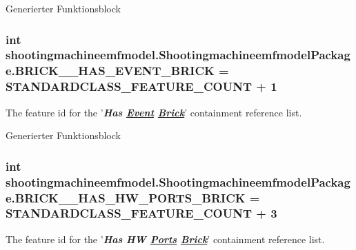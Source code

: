 Generierter Funktionsblock  \hypertarget{interfaceshootingmachineemfmodel_1_1_shootingmachineemfmodel_package_a3ca25fb82ba83cfac1da41d268bd1847}{
\subsubsection[{B\-R\-I\-C\-K\-\_\-\-\_\-\-H\-A\-S\-\_\-\-E\-V\-E\-N\-T\-\_\-\-B\-R\-I\-C\-K}]{\setlength{\rightskip}{0pt plus 5cm}int shootingmachineemfmodel.\-Shootingmachineemfmodel\-Package.\-B\-R\-I\-C\-K\-\_\-\-\_\-\-H\-A\-S\-\_\-\-E\-V\-E\-N\-T\-\_\-\-B\-R\-I\-C\-K = {\bf S\-T\-A\-N\-D\-A\-R\-D\-C\-L\-A\-S\-S\-\_\-\-F\-E\-A\-T\-U\-R\-E\-\_\-\-C\-O\-U\-N\-T} + 1}}\label{interfaceshootingmachineemfmodel_1_1_shootingmachineemfmodel_package_a3ca25fb82ba83cfac1da41d268bd1847}
The feature id for the '{\itshape {\bfseries Has \hyperlink{interfaceshootingmachineemfmodel_1_1_event}{Event} \hyperlink{interfaceshootingmachineemfmodel_1_1_brick}{Brick}}}' containment reference list.

Generierter Funktionsblock  \hypertarget{interfaceshootingmachineemfmodel_1_1_shootingmachineemfmodel_package_a28d1fb8532da1a292139a225edce3919}{
\subsubsection[{B\-R\-I\-C\-K\-\_\-\-\_\-\-H\-A\-S\-\_\-\-H\-W\-\_\-\-P\-O\-R\-T\-S\-\_\-\-B\-R\-I\-C\-K}]{\setlength{\rightskip}{0pt plus 5cm}int shootingmachineemfmodel.\-Shootingmachineemfmodel\-Package.\-B\-R\-I\-C\-K\-\_\-\-\_\-\-H\-A\-S\-\_\-\-H\-W\-\_\-\-P\-O\-R\-T\-S\-\_\-\-B\-R\-I\-C\-K = {\bf S\-T\-A\-N\-D\-A\-R\-D\-C\-L\-A\-S\-S\-\_\-\-F\-E\-A\-T\-U\-R\-E\-\_\-\-C\-O\-U\-N\-T} + 3}}\label{interfaceshootingmachineemfmodel_1_1_shootingmachineemfmodel_package_a28d1fb8532da1a292139a225edce3919}
The feature id for the '{\itshape {\bfseries Has H\-W \hyperlink{interfaceshootingmachineemfmodel_1_1_ports}{Ports} \hyperlink{interfaceshootingmachineemfmodel_1_1_brick}{Brick}}}' containment reference list.

